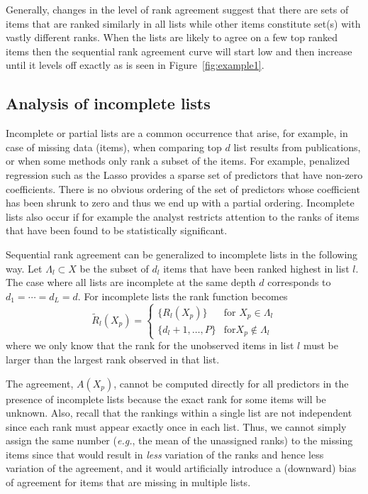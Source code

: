 \documentclass[oupdraft]{bio}
\makeatletter
\newcommand{\eg}{\emph{e.g.}\@\xspace}
\makeatother
\begin{document}


Generally, changes in the level of rank agreement suggest that there
are sets of items that are ranked similarly in all lists while other
items constitute set(s) with vastly different
ranks. When the lists are likely to agree on a few top ranked items
then the sequential rank agreement curve will start low and
then increase until it levels off exactly as is seen in
Figure~\ref{fig:example1}.

\subsection{Analysis of incomplete lists}
Incomplete or partial lists are a common occurrence that arise, for
example, in case of missing data (items), when comparing top $d$ list
results from publications, or when some methods only rank a subset of
the items. For example, penalized regression such as the Lasso
provides a sparse set of predictors that have non-zero
coefficients. There is no obvious ordering of the set of predictors
whose coefficient has been shrunk to zero and thus we end up with a
partial ordering.  Incomplete lists also occur if for example the analyst
restricts attention to the ranks of items that have been found to be
statistically significant.

Sequential rank agreement can be generalized to incomplete lists in
the following way. Let $\Lambda_l\subset X$ be the subset of $d_l$
items that have been ranked highest in list $l$.  The case where all
lists are incomplete at the same depth $d$ corresponds to
$d_1=\cdots=d_L=d$. For incomplete lists the rank function becomes
\begin{equation}
	\widetilde R_l(X_p) = \begin{cases}
	     \{R_l(X_p)\} & \text{for } X_p\in \Lambda_l\\
	     \{d_l+1,\dots,P\} & \text{for} X_p \not\in \Lambda_l
        \end{cases}
\end{equation}
where we only know that the rank for the unobserved items in list $l$
must be larger than the largest rank observed in that list.

The agreement, $A(X_p)$, cannot be computed directly for all
predictors in the presence of incomplete lists because the exact rank
for some items will be unknown. Also, recall that the rankings within
a single list are not independent since each rank must appear exactly
once in each list. Thus, we cannot simply assign the same number
(\eg, the mean of the unassigned ranks) to the missing items since
that would result in \emph{less} variation of the ranks and hence less
variation of the agreement, and it would artificially introduce a
(downward) bias of agreement for items that are missing in multiple
lists.
\end{document}
